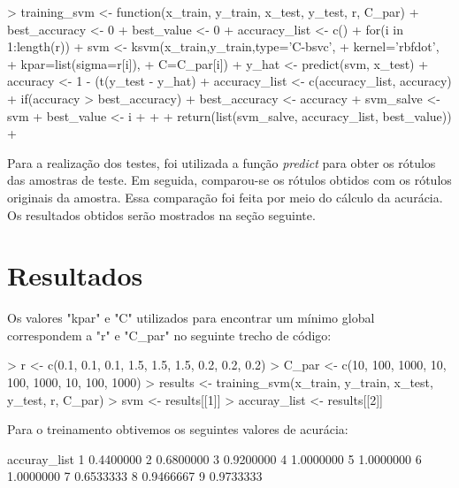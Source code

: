 \documentclass[12pt]{article}
\begin{document}
\begin{Schunk}
\begin{Sinput}
> training_svm <- function(x_train, y_train, x_test, y_test, r, C_par){
+   best_accuracy <- 0
+   best_value <- 0
+   accuracy_list <- c()
+   for(i in 1:length(r)){
+     svm <- ksvm(x_train,y_train,type='C-bsvc',
+                 kernel='rbfdot',
+                 kpar=list(sigma=r[i]),
+                 C=C_par[i])
+     y_hat <- predict(svm, x_test)
+     accuracy <- 1 - (t(y_test - y_hat) %
+     accuracy_list <- c(accuracy_list, accuracy)
+     if(accuracy > best_accuracy){
+       best_accuracy <- accuracy
+       svm_salve <- svm
+       best_value <- i
+     }
+   }
+   return(list(svm_salve, accuracy_list, best_value))
+ }
\end{Sinput}
\end{Schunk}

  \par Para a realização dos testes, foi utilizada a função \textit{predict} para obter os rótulos das amostras de teste. Em seguida, comparou-se os rótulos obtidos com os rótulos originais da amostra. Essa comparação foi feita por meio do cálculo da acurácia. Os resultados obtidos serão mostrados na seção seguinte. 

\section{Resultados}

  \par Os valores "kpar" e "C" utilizados para encontrar um mínimo global correspondem a "r" e "C\_par" no seguinte trecho de código:
\begin{Schunk}
\begin{Sinput}
> r <- c(0.1, 0.1, 0.1, 1.5, 1.5, 1.5, 0.2, 0.2, 0.2)
> C_par <- c(10, 100, 1000, 10, 100, 1000, 10, 100, 1000)
> results <- training_svm(x_train, y_train, x_test, y_test, r, C_par)
> svm <- results[[1]]
> accuray_list <- results[[2]]
\end{Sinput}
\end{Schunk}

  \par Para o treinamento obtivemos os seguintes valores de acurácia:

\begin{Schunk}
\begin{Soutput}
  accuray_list
1    0.4400000
2    0.6800000
3    0.9200000
4    1.0000000
5    1.0000000
6    1.0000000
7    0.6533333
8    0.9466667
9    0.9733333
\end{Soutput}
\end{Schunk}
\end{document}
